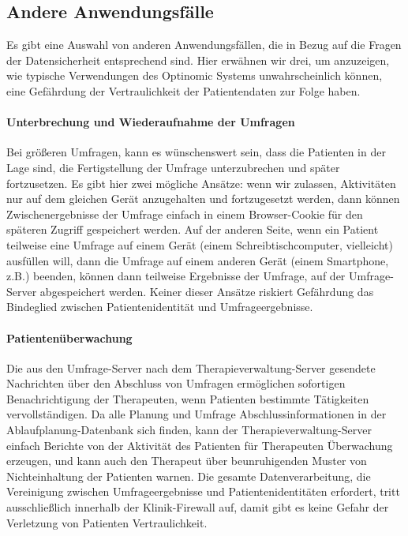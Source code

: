 \documentclass[DIV=calc,paper=a4,fontsize=11pt,twocolumn]{scrartcl}
\begin{document}
\subsection*{Andere Anwendungsfälle}

Es gibt eine Auswahl von anderen Anwendungsfällen, die in Bezug auf
die Fragen der Datensicherheit entsprechend sind. Hier erwähnen wir
drei, um anzuzeigen, wie typische Verwendungen des Optinomic Systems
unwahrscheinlich können, eine Gefährdung der Vertraulichkeit der
Patientendaten zur Folge haben.

\paragraph{Unterbrechung und Wiederaufnahme der Umfragen}

Bei größeren Umfragen, kann es wünschenswert sein, dass die Patienten
in der Lage sind, die Fertigstellung der Umfrage unterzubrechen und
später fortzusetzen. Es gibt hier zwei mögliche Ansätze: wenn wir
zulassen, Aktivitäten nur auf dem gleichen Gerät anzugehalten und
fortzugesetzt werden, dann können Zwischenergebnisse der Umfrage
einfach in einem Browser-Cookie für den späteren Zugriff gespeichert
werden. Auf der anderen Seite, wenn ein Patient teilweise eine Umfrage
auf einem Gerät (einem Schreibtischcomputer, vielleicht) ausfüllen
will, dann die Umfrage auf einem anderen Gerät (einem Smartphone,
z.B.) beenden, können dann teilweise Ergebnisse der Umfrage, auf der
Umfrage-Server abgespeichert werden. Keiner dieser Ansätze riskiert
Gefährdung das Bindeglied zwischen Patientenidentität und
Umfrageergebnisse.

\paragraph{Patientenüberwachung}

Die aus den Umfrage-Server nach dem Therapieverwaltung-Server
gesendete Nachrichten über den Abschluss von Umfragen ermöglichen
sofortigen Benachrichtigung der Therapeuten, wenn Patienten bestimmte
Tätigkeiten vervollständigen. Da alle Planung und Umfrage
Abschlussinformationen in der Ablaufplanung-Datenbank sich finden,
kann der Therapieverwaltung-Server einfach Berichte von der Aktivität
des Patienten für Therapeuten Überwachung erzeugen, und kann auch den
Therapeut über beunruhigenden Muster von Nichteinhaltung der Patienten
warnen. Die gesamte Datenverarbeitung, die Vereinigung zwischen
Umfrageergebnisse und Patientenidentitäten erfordert, tritt
ausschließlich innerhalb der Klinik-Firewall auf, damit gibt es keine
Gefahr der Verletzung von Patienten Vertraulichkeit.
\end{document}

